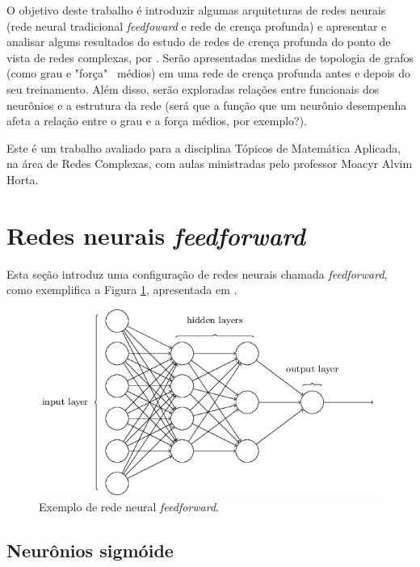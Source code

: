 \documentclass{article}
\begin{document}
        O objetivo deste trabalho é introduzir algumas arquiteturas de redes neurais (rede neural tradicional \textit{feedfoward} e rede de crença profunda)
        e apresentar e analisar alguns resultados do estudo de redes de crença profunda do ponto de vista de redes complexas, por \cite{testolin2018deep}.
        Serão apresentadas medidas de topologia de grafos (como grau e "força" \ médios) em uma rede de crença profunda antes e depois do seu treinamento.
        Além disso, serão exploradas relações entre funcionais dos neurônios e a estrutura da rede (será que a função que um neurônio desempenha afeta a relação entre o grau e a força médios, por exemplo?).

        Este é um trabalho avaliado para a disciplina Tópicos de Matemática Aplicada, na área de Redes Complexas, com aulas ministradas pelo professor Moacyr Alvim Horta.

    \section{Redes neurais \textit{feedforward}}
        \label{feedforward}

        Esta seção introduz uma configuração de redes neurais chamada \textit{feedforward}, como exemplifica a Figura \ref{fig1}, apresentada em \cite{nielsen2015neural}.

        \begin{figure}[h!]
            \centering
            \includegraphics[scale=0.5]{Images/Feedforward neural network.png}
            \caption{Exemplo de rede neural \textit{feedforward}.}
            \label{fig1}
        \end{figure}        

        \subsection{Neurônios sigmóide}
\end{document}

